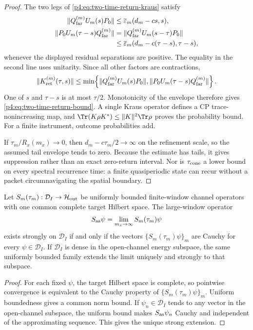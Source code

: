 \documentclass[12pt,a4paper]{article}
\begin{document}
\begin{proof}
The two legs of \eqref{p4:eq:two-time-return-kraus} satisfy
\[
\begin{aligned}
\|Q_{\rm far}^{(m)}U_m(s)P_0\|
&\le
\overline\varepsilon_m(d_m-cs,s),\\
\|P_0U_m(\tau-s)Q_{\rm far}^{(m)}\|
&=
\|Q_{\rm far}^{(m)}U_m(s-\tau)P_0\|\\
&\le
\overline\varepsilon_m(d_m-c(\tau-s),\tau-s),
\end{aligned}
\]
whenever the displayed residual separations are positive.  The equality in
the second line uses unitarity.  Since all other factors are contractions,
\[
\|K_{\rm ret}^{(m)}(\tau,s)\|
\le
\min\!\left\{
\|Q_{\rm far}^{(m)}U_m(s)P_0\|,
\|P_0U_m(\tau-s)Q_{\rm far}^{(m)}\|
\right\}.
\]
One of \(s\) and \(\tau-s\) is at most \(\tau/2\).  Monotonicity of the
envelope therefore gives \eqref{p4:eq:two-time-return-bound}.  A single Kraus
operator defines a CP trace-nonincreasing map, and
\(\Tr(K\rho K^*)\le\|K\|^2\Tr\rho\) proves the probability bound.
For a finite instrument, outcome probabilities add.

If \(\tau_m/R_x(m_x)\to0\), then
\(d_m-c\tau_m/2\to\infty\) on the refinement scale, so the assumed tail
envelope tends to zero.  Because the estimate has tails, it gives
suppression rather than an exact zero-return interval.  Nor is
\(\tau_{\rm cone}\) a lower bound on every spectral recurrence time: a finite
quasiperiodic state can recur without a packet circumnavigating the spatial
boundary.
\end{proof}


\begin{lemma}
\label{p4:lem:finite-window-scattering-cauchy-criterion}
Let \(S_m(\tau_m):\mathcal D_I\to\mathcal H_{\rm out}\) be uniformly bounded
finite-window channel operators with one common complete target Hilbert
space.  The large-window
operator
\[
S_{\rm as}\psi=\lim_{m_x\to\infty}S_m(\tau_m)\psi
\]
exists strongly on \(\mathcal D_I\) if and only if the vectors
\(\{S_m(\tau_m)\psi\}_m\) are Cauchy for every \(\psi\in\mathcal D_I\).
If \(\mathcal D_I\) is dense in the open-channel energy subspace, the
same uniformly bounded family extends the limit uniquely and strongly to
that subspace.
\end{lemma}

\begin{proof}
For each fixed \(\psi\), the target Hilbert space is complete, so
pointwise convergence is equivalent to the Cauchy property of
\(\{S_m(\tau_m)\psi\}_m\).  Uniform boundedness gives a common norm bound.
If \(\psi_n\in\mathcal D_I\) tends to any vector in the open-channel
subspace, the uniform bound makes \(S_{\rm as}\psi_n\) Cauchy and
independent of the approximating sequence.  This gives the unique strong
extension.
\end{proof}
\end{document}
